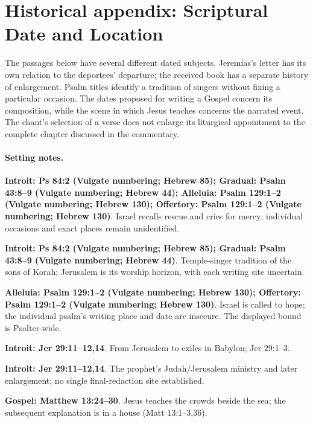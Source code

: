 \section{Historical appendix: Scriptural Date and Location}
\label{historical-appendix}

The passages below have several different dated subjects. Jeremias's
letter has its own relation to the deportees' departure; the received
book has a separate history of enlargement. Psalm titles identify a
tradition of singers without fixing a particular occasion. The dates
proposed for writing a Gospel concern its composition, while the scene
in which Jesus teaches concerns the narrated event. The chant's selection
of a verse does not enlarge its liturgical appointment to the complete
chapter discussed in the commentary.



\paragraph{Setting notes.}
\noindent\textbf{Introit: Ps 84:2 (Vulgate numbering; Hebrew 85); Gradual: Psalm 43:8--9 (Vulgate numbering; Hebrew 44); Alleluia: Psalm 129:1--2 (Vulgate numbering; Hebrew 130); Offertory: Psalm 129:1--2 (Vulgate numbering; Hebrew 130)}. Israel recalls rescue and cries for mercy; individual occasions and exact places remain unidentified.

\noindent\textbf{Introit: Ps 84:2 (Vulgate numbering; Hebrew 85); Gradual: Psalm 43:8--9 (Vulgate numbering; Hebrew 44)}. Temple-singer tradition of the sons of Korah; Jerusalem is its worship horizon, with each writing site uncertain.

\noindent\textbf{Alleluia: Psalm 129:1--2 (Vulgate numbering; Hebrew 130); Offertory: Psalm 129:1--2 (Vulgate numbering; Hebrew 130)}. Israel is called to hope; the individual psalm's writing place and date are insecure. The displayed bound is Psalter-wide.

\noindent\textbf{Introit: Jer 29:11--12,14}. From Jerusalem to exiles in Babylon; Jer 29:1--3.

\noindent\textbf{Introit: Jer 29:11--12,14}. The prophet's Judah/Jerusalem ministry and later enlargement; no single final-redaction site established.

\noindent\textbf{Gospel: Matthew 13:24--30}. Jesus teaches the crowds beside the sea; the subsequent explanation is in a house (Matt 13:1--3,36).

